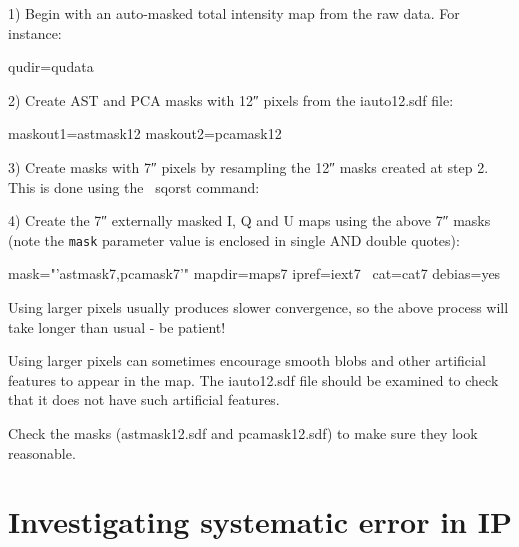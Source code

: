 1) Begin with an auto-masked total intensity map from the raw data. For instance:

\begin{terminalv}
                    qudir=qudata
\end{terminalv}


2) Create AST and PCA masks with 12\si{\arcsecond} pixels from the iauto12.sdf file:


\begin{terminalv}
                   maskout1=astmask12 maskout2=pcamask12
\end{terminalv}

3) Create masks with 7\si{\arcsecond} pixels by resampling the 12\si{\arcsecond} masks created at
step 2. This is done using the \Kappa\ sqorst command:

\begin{terminalv}
\end{terminalv}

4) Create the 7\si{\arcsecond} externally masked I, Q and U maps using the above 7\si{\arcsecond}
masks (note the \texttt{mask} parameter value  is enclosed in single AND
double quotes):

\begin{terminalv}
                  mask="'astmask7,pcamask7'" mapdir=maps7 ipref=iext7  \
                  cat=cat7 debias=yes
\end{terminalv}


\begin{tip}
Using larger pixels usually produces slower convergence, so the
above process will take longer than usual - be patient!

Using larger pixels can sometimes encourage smooth blobs and other
artificial features to appear in the map. The
iauto12.sdf file should be examined to check that it does not have such artificial
features.

Check the masks (astmask12.sdf and pcamask12.sdf) to make sure
they look reasonable.
\end{tip}

\section{Investigating systematic error in IP}


